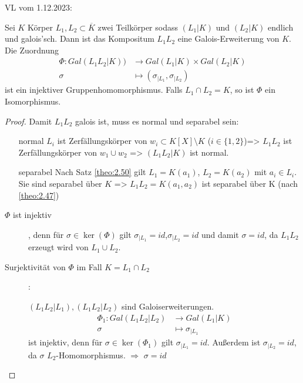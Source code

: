 \documentclass[../main.tex]{subfiles}
\begin{document}
\begin{flushright}
VL vom 1.12.2023:
\end{flushright}
\begin{theorem}[Produktsatz]
Sei $K$ Körper
    $L_1,L_2\subset \overline{K}$ zwei Teilkörper sodass $(L_1|K)$ und $(L_2|K)$ endlich und galois'sch.
    Dann ist das Kompositum $L_1L_2$ eine Galois-Erweiterung von $K$.
    Die Zuordnung 
    \begin{align*}
        \Phi\colon Gal(L_1L_2|K))&\rightarrow Gal(L_1|K)\times Gal(L_2|K)\\
        \sigma &\mapsto (\sigma_{|L_1},\sigma_{|L_2})
    \end{align*}
    ist ein injektiver Gruppenhomomorphismus.
    Falls $L_1\cap L_2 = K$, so ist $\Phi$ ein Isomorphismus.
\end{theorem}
\begin{proof}
    Damit $L_1L_2$ galois ist, muss es normal und separabel sein:
    \begin{itemize}
        \item[normal] $L_i$ ist Zerfällungskörper von $w_i\subset K[X]\setminus K$ ($i\in\{1,2\}$)=> $L_1L_2$ ist Zerfällungskörper von $w_1\cup w_2$ => $(L_1L_2|K)$ ist normal.
        \item[separabel] Nach Satz \ref{theo:2.50} gilt $L_1 = K(a_1)$, $L_2=K(a_2)$ mit $a_i\in L_i$.
        Sie sind separabel über $K$ => $L_1L_2 = K(a_1,a_2)$ ist separabel über K (nach \ref{theo:2.47})
    \end{itemize}

    \begin{description}
        \item[$\Phi$ ist injektiv], denn für $\sigma\in \ker(\Phi)$ gilt $\sigma_{|L_1} =id$,$\sigma_{|L_2} = id$ und damit $\sigma = id$, da $L_1L_2$ erzeugt wird von $L_1\cup L_2$.
        \item[Surjektivität von $\Phi$ im Fall $K = L_1\cap L_2$]:
        
        $(L_1L_2|L_1), (L_1L_2|L_2)$ sind Galoiserweiterungen.
        \begin{align*}
            \Phi_1: Gal(L_1L_2|L_2)&\rightarrow Gal(L_1|K)\\
            \sigma &\mapsto \sigma_{|L_1}
        \end{align*}
         ist injektiv, denn für $\sigma \in \ker(\Phi_1)$ gilt $\sigma_{|L_1} = id$.
        Außerdem ist $\sigma_{|L_2} = id$, da $\sigma$ $L_2$-Homomorphismus. $\Rightarrow$ $\sigma = id$
    

\end{description}
\end{proof}
\end{document}
